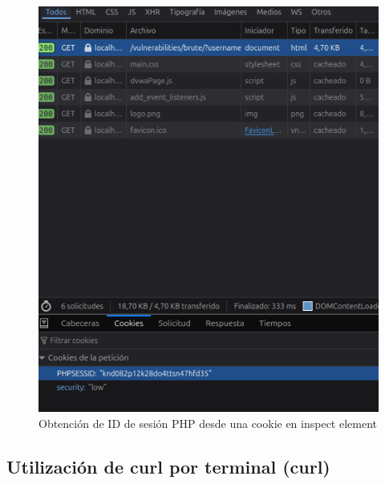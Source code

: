 \documentclass[letterpaper,12pt]{article}
\let\origsubsection\subsection
\renewcommand{\subsection}{\FloatBarrier\origsubsection}
\begin{document}
\begin{figure}
    \centering
    \includegraphics[width=1\linewidth]{curl/Captura desde 2025-10-01 23-43-11.png}
    \caption{Obtención de ID de sesión PHP desde una cookie en inspect element}
    \label{fig:inspectelementcookie}
\end{figure}
\subsection{Utilización de curl por terminal (curl)}
\end{document}
